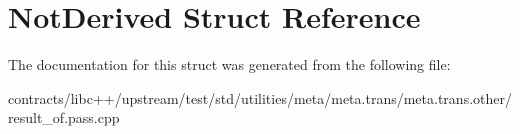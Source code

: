 \hypertarget{struct_not_derived}{}\section{Not\+Derived Struct Reference}
\label{struct_not_derived}


The documentation for this struct was generated from the following file\+:\begin{DoxyCompactItemize}
\item 
contracts/libc++/upstream/test/std/utilities/meta/meta.\+trans/meta.\+trans.\+other/result\+\_\+of.\+pass.\+cpp\end{DoxyCompactItemize}

